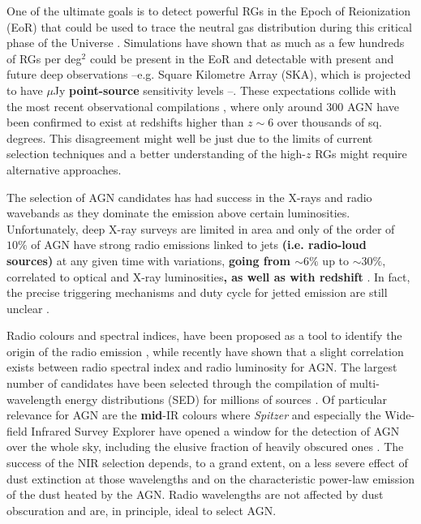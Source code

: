 \documentclass{aa}
\begin{document}
One of the ultimate goals is to detect powerful RGs in the Epoch of Reionization (EoR) that could be used to trace the neutral gas distribution during this critical phase of the Universe \citep[e.g.][]{2004NewAR..48.1029C, 2013MNRAS.435..460J}. Simulations  have shown that as much as a few hundreds of RGs per deg$^2$ could be present in the EoR \citep[][]{2019MNRAS.485.2694A, 2019MNRAS.482....2B, 2021MNRAS.503.3492T} and detectable with present and future deep observations --e.g. Square Kilometre Array (SKA), which is projected to have $\mu$Jy \textbf{point-source} sensitivity levels \textbf{\citep{2015aska.confE..67P, 2019arXiv191212699B}}--. These expectations collide with the most recent observational compilations \citep[e.g.][]{2020ARA&A..58...27I, 2020MNRAS.494..789R, sarah_e_i_bosman_2022_6039724, 2022arXiv221206907F}, where only around $300$ AGN have been confirmed to exist at redshifts higher than $z{\sim}6$ over thousands of sq. degrees. This disagreement might well be just due to the limits of current selection techniques and a better understanding of the high-$z$ RGs might require alternative approaches.

The selection of AGN candidates has had success in the X-rays and radio wavebands as they dominate the emission above certain luminosities. Unfortunately, deep X-ray surveys are limited in area and only of the order of $10\%$ of AGN have strong radio emissions linked to jets \textbf{(i.e. radio-loud sources)} at any given time with variations, \textbf{going from $\sim 6\%$} up to \textbf{$\sim 30\%$}, correlated to optical and X-ray luminosities\textbf{, as well as with redshift} \citep[e.g.][]{1993MNRAS.263..461P, 1994ApJ...430..533D, 2007ApJ...656..680J, 2019NatAs...3...48S, 2021MNRAS.506.5888M, 2022A&A...668A..27G, 2023MNRAS.tmp.1261B}. In fact, the precise triggering mechanisms and duty cycle for jetted emission are still unclear \citep{2015aska.confE..71A, 2022MNRAS.510.1163P}.

Radio colours and spectral indices, have been proposed as a tool to identify the origin of the radio emission \citep{2000A&A...354..423L}, while recently \citet{2019A&A...622A..17S} have shown that a  slight correlation exists between radio spectral index and radio luminosity for AGN.
The largest number of candidates have been selected through the compilation of multi-wavelength energy distributions (SED) for millions of sources \citep{2018ARA&A..56..625H, 2020PhDT.........3P}.  Of particular relevance for AGN are the \textbf{mid}-IR colours where \textit{Spitzer} \citep{2004ApJS..154....1W} and especially  the Wide-field Infrared Survey Explorer \citep[\textit{WISE};][]{2010AJ....140.1868W} have opened a window for the detection of AGN over the whole sky, including the elusive fraction of heavily obscured ones \citep[e.g.][]{2012ApJ...753...30S, 2012MNRAS.426.3271M, 2017ApJ...836..182J, 2018ApJS..234...23A, 2021ApJ...922..179B}. The success of the NIR selection depends, to a grand extent, on a less severe effect of dust extinction at those wavelengths and on the characteristic power-law emission of the dust heated by the AGN. Radio wavelengths are not affected by dust obscuration and are, in principle, ideal to select AGN.
\end{document}
